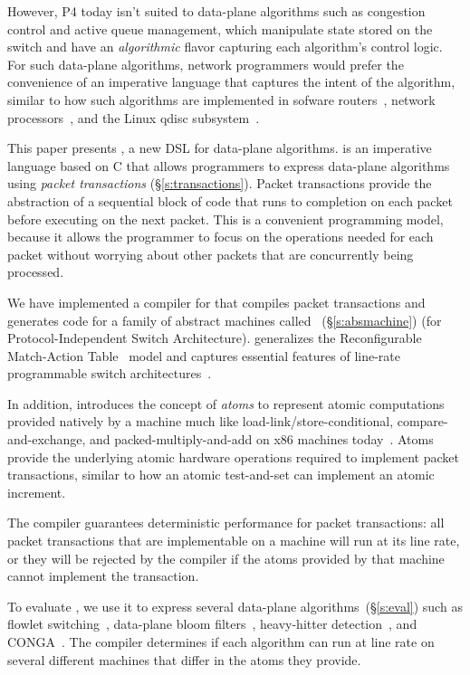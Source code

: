 However, P4 today isn't suited to data-plane algorithms such as congestion
control and active queue management, which manipulate state stored on the
switch and have an \textit{algorithmic} flavor capturing each algorithm's
control logic.  For such data-plane algorithms, network programmers would
prefer the convenience of an imperative language that captures the intent of
the algorithm, similar to how such algorithms are implemented in sofware
routers~\cite{click}, network processors~\cite{packetc, nova}, and the Linux
qdisc subsystem~\cite{qdisc}.

This paper presents \pktlanguage, a new DSL for data-plane algorithms.
\pktlanguage is an imperative language based on C that allows programmers to
express data-plane algorithms using {\em packet transactions}
(\S\ref{s:transactions}).  Packet transactions provide the abstraction of a
sequential block of code that runs to completion on each packet before
executing on the next packet. This is a convenient programming model, because
it allows the programmer to focus on the operations needed for each packet
without worrying about other packets that are concurrently being processed.

We have implemented a compiler for \pktlanguage that compiles \pktlanguage
packet transactions and generates code for a family of abstract machines called
\absmachine~(\S\ref{s:absmachine}) (for Protocol-Independent Switch
Architecture). \absmachine generalizes the Reconfigurable Match-Action
Table~\cite{rmt} model and captures essential features of line-rate programmable
switch architectures~\cite{rmt, xpliant, flexpipe}.

In addition, \absmachine introduces the concept of {\em atoms} to represent
atomic computations provided natively by a \absmachine machine much like
load-link/store-conditional, compare-and-exchange, and packed-multiply-and-add
on x86 machines today~\cite{x86_manual}.  Atoms provide the underlying atomic
hardware operations required to implement packet transactions, similar to how
an atomic test-and-set can implement an atomic increment.

The \pktlanguage compiler guarantees deterministic performance for packet
transactions: all packet transactions that are implementable on a \absmachine
machine will run at its line rate, or they will be rejected by the compiler if
the atoms provided by that \absmachine machine cannot implement the
transaction.

To evaluate \pktlanguage, we use it to express several data-plane
algorithms~(\S\ref{s:eval}) such as flowlet switching~\cite{flowlets},
data-plane bloom filters~\cite{bloom}, heavy-hitter
detection~\cite{opensketch}, and CONGA~\cite{conga}.  The \pktlanguage compiler
determines if each algorithm can run at line rate on several different
\absmachine machines that differ in the atoms they provide.


